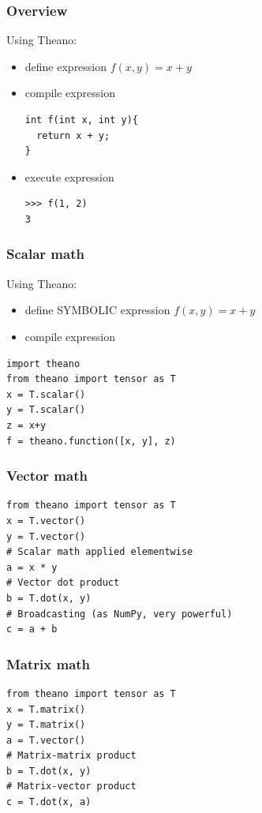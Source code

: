 \documentclass[utf8x,xcolor=pdftex,dvipsnames,table]{beamer}
\begin{document}
\begin{frame}[fragile]
  \frametitle{Overview}
  Using Theano:
  \begin{itemize}
  \item define expression $f(x,y) = x + y$
  \item compile expression
\begin{lstlisting}
int f(int x, int y){
  return x + y;
}
\end{lstlisting}

  \item execute expression
\begin{lstlisting}
>>> f(1, 2)
3
\end{lstlisting}
  \end{itemize}
\end{frame}

\begin{frame}[fragile]
  \frametitle{Scalar math}
  Using Theano:
  \begin{itemize}
  \item define SYMBOLIC expression $f(x,y) = x + y$
  \item compile expression
  \end{itemize}
\begin{lstlisting}
import theano
from theano import tensor as T
x = T.scalar()
y = T.scalar()
z = x+y
f = theano.function([x, y], z)
\end{lstlisting}
\end{frame}

\begin{frame}[fragile]
  \frametitle{Vector math}

\begin{lstlisting}
from theano import tensor as T
x = T.vector()
y = T.vector()
# Scalar math applied elementwise
a = x * y
# Vector dot product
b = T.dot(x, y)
# Broadcasting (as NumPy, very powerful)
c = a + b
\end{lstlisting}
\end{frame}

\begin{frame}[fragile]
  \frametitle{Matrix math}

\begin{lstlisting}
from theano import tensor as T
x = T.matrix()
y = T.matrix()
a = T.vector()
# Matrix-matrix product
b = T.dot(x, y)
# Matrix-vector product
c = T.dot(x, a)
\end{lstlisting}
\end{frame}
\end{document}

